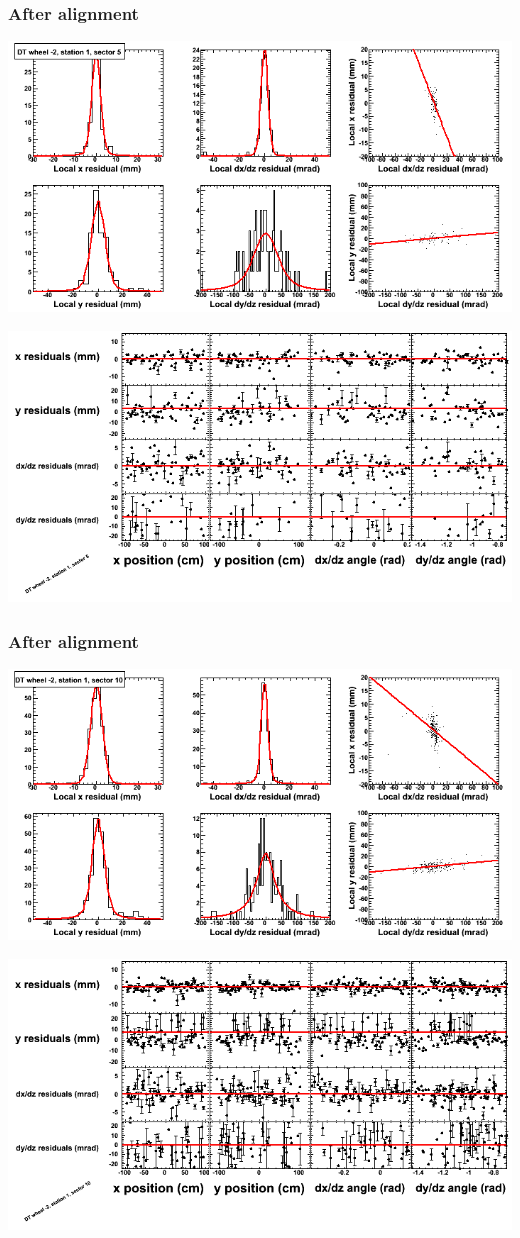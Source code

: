 \documentclass[compress]{beamer}
\begin{document}
\begin{frame}
\frametitle{After alignment}
\includegraphics[width=0.7\linewidth]{NOV4_fitfunctions/MBwhAst1sec05_bellcurves.png}

\includegraphics[width=0.7\linewidth]{NOV4_fitfunctions/MBwhAst1sec05_polynomials.png}
\end{frame}

\begin{frame}
\frametitle{After alignment}
\includegraphics[width=0.7\linewidth]{NOV4_fitfunctions/MBwhAst1sec10_bellcurves.png}

\includegraphics[width=0.7\linewidth]{NOV4_fitfunctions/MBwhAst1sec10_polynomials.png}
\end{frame}
\end{document}
